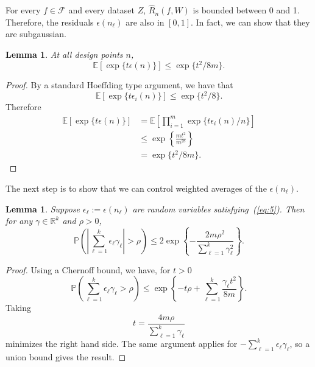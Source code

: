 \documentclass[11pt]{article}
\newtheorem{lemma}[theorem]{Lemma}
\newcommand{\F}{\mathcal{F}}
\newcommand{\E}{\mathbb{E}}
\renewcommand{\P}{\mathbb{P}}
\newcommand{\R}{\mathbb{R}}
\renewcommand{\eqref}[1]{(\ref{eq:#1})}
\renewcommand{\hat}[1]{\widehat{#1}}
\begin{document}
For every $f\in\F$ and every dataset $Z$, $\hat{R}_n(f,W)$ is bounded between 0
and 1. Therefore, the residuals $\epsilon(n_\ell)$ are also in $[0,1]$. In
fact, we can show that they are subgaussian.
\begin{lemma} At all design points $n$,
  \label{lem:1}
  \begin{equation}
    \E[\exp\{t\epsilon(n)\}] \leq \exp\{t^2/8m\}.\label{eq:5}
  \end{equation}
\end{lemma}
\begin{proof}
  By a standard Hoeffding type argument, we have that
  \begin{equation*}
    \label{eq:6}
    \E[\exp\{t\epsilon_i(n)\}] \leq \exp\{t^2/8\}.
  \end{equation*}
  Therefore
  \begin{align*}
   \E[\exp\{t\epsilon(n)\}] &= \E\left[\prod_{i=1}^m\exp\{t\epsilon_i(n)/n\}\right]\\
   &\leq \exp\left\{\frac{mt^2}{m^28}\right\} \\
   &=\exp\{t^2/8m\}.
  \end{align*}
\end{proof}
The next step is to show that we can control weighted averages of the
$\epsilon(n_\ell)$.
\begin{lemma}
  \label{lem:2}
  Suppose $\epsilon_\ell :=\epsilon(n_\ell)$ are random variables
  satisfying~\eqref{5}. Then for any $\gamma \in \R^k$ and $\rho>0$,
  \begin{equation*}
    \label{eq:4a}
    \P \left( \left|\sum_{\ell=1}^k {\epsilon_\ell \gamma_\ell}\right|  > \rho\right)
    \leq 2\exp \left\{ - \frac{2m\rho^2} { \sum_{\ell=1}^k {\gamma_\ell^2}} \right\}.
  \end{equation*}
\end{lemma}
\begin{proof}
  Using a Chernoff bound, we have, for $t>0$
  \begin{equation*}
    \label{eq:5a}
    \P \left(  \sum_{\ell=1}^k{\epsilon_\ell \gamma_\ell}  >
      \rho\right) \leq \exp\left\{ -t\rho + \sum_{\ell=1}^k{\frac{\gamma_\ell t^2}{8m}} \right\}.
  \end{equation*}
  Taking
  \begin{equation*}
    \label{eq:6a}
    t = \frac{4m\rho}{\sum_{\ell=1}^k{\gamma_\ell}}
  \end{equation*}
  minimizes the right hand side. The same argument applies for
  $-\sum_{\ell=1}^k{\epsilon_\ell \gamma_\ell}$, so a union bound gives the
  result.
\end{proof}
\end{document}
